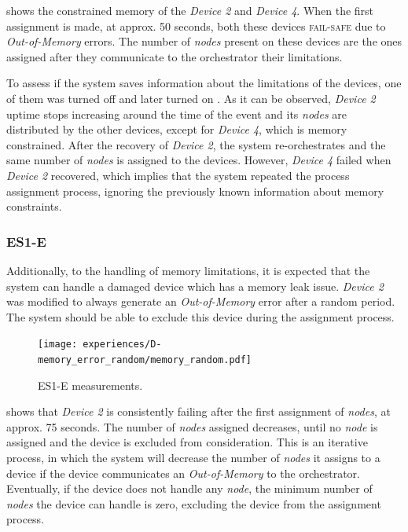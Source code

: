  shows the constrained memory of the \textit{Device 2} and \textit{Device 4}. When the first assignment is made, at approx. 50 seconds, both these devices \textsc{fail-safe} due to \textit{Out-of-Memory} errors. The number of \textit{nodes} present on these devices are the ones assigned after they communicate to the orchestrator their limitations. 

To assess if the system saves information about the limitations of the devices, one of them was turned off and later turned on . As it can be observed, \textit{Device 2} uptime stops increasing around the time of the event and its \textit{nodes} are distributed by the other devices, except for \textit{Device 4}, which is memory constrained. After the recovery of \textit{Device 2}, the system re-orchestrates and the same number of \textit{nodes} is assigned to the devices. However, \textit{Device 4} failed when \textit{Device 2} recovered, which implies that the system repeated the process assignment process, ignoring the previously known information about memory constraints.


\subsubsection{ES1-E}

Additionally, to the handling of memory limitations, it is expected that the system can handle a damaged device which has a memory leak issue. \textit{Device 2} was modified to always generate an \textit{Out-of-Memory} error after a random period. The system should be able to exclude this device during the assignment process.

\begin{figure}[h]
\centering
\texttt{[image: experiences/D-memory\_error\_random/memory\_random.pdf]}
\caption[ES1-E measurements]{ES1-E measurements.}\label{fig:experiment_d_graph}
\end{figure}

 shows that \textit{Device 2} is consistently failing after the first assignment of \textit{nodes}, at approx. 75 seconds. The number of \textit{nodes} assigned decreases, until no \textit{node} is assigned and the device is excluded from consideration. This is an iterative process, in which the system will decrease the number of \textit{nodes} it assigns to a device if the device communicates an \textit{Out-of-Memory} to the orchestrator. Eventually, if the device does not handle any \textit{node}, the minimum number of \textit{nodes} the device can handle is zero, excluding the device from the assignment process.

